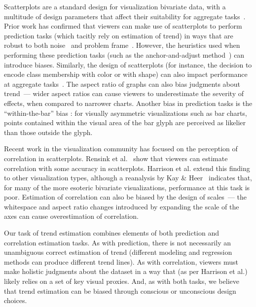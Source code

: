 \documentclass{sigchi}
\begin{document}
Scatterplots are a standard design for visualization bivariate data, with a multitude of design parameters that affect their suitability for aggregate tasks~\cite{cleveland1984many}. Prior work has confirmed that viewers can make use of scatterplots to perform prediction tasks (which tacitly rely on estimation of trend) in ways that are robust to both noise~\cite{harvey1997effects} and problem frame~\cite{lewandowsky2011popular}. However, the heuristics used when performing these prediction tasks (such as the anchor-and-adjust method~\cite{bolger1993context}) can introduce biases. Similarly, the design of scatterplots (for instance, the decision to encode class membership with color or with shape) can also impact performance at aggregate tasks~\cite{gleicher2013perception,lewandowsky1989discriminating}. The aspect ratio of graphs can also bias judgments about trend~\cite{beattie2002impact}--- wider aspect ratios can cause viewers to underestimate the severity of effects, when compared to narrower charts. Another bias in prediction tasks is the ``within-the-bar'' bias \cite{newman2012bar}: for visually asymmetric visualizations such as bar charts, points contained within the visual area of the bar glyph are perceived as likelier than those outside the glyph. 

Recent work in the visualization community has focused on the perception of correlation in scatterplots. Rensink et al.~\cite{rensink2010perception} show that viewers can estimate correlation with some accuracy in scatterplots. Harrison et al. \cite{harrison2014ranking} extend this finding to other visualization types, although a reanalysis by Kay \& Heer~\cite{kay2016beyond} indicates that, for many of the more esoteric bivariate visualizations, performance at this task is poor. Estimation of correlation can also be biased by the design of scales~\cite{cleveland1982variables}--- the whitespace and aspect ratio changes introduced by expanding the scale of the axes can cause overestimation of correlation.

Our task of trend estimation combines elements of both prediction and correlation estimation tasks. As with prediction, there is not necessarily an unambiguous correct estimation of trend (different modeling and regression methods can produce different trend lines). As with correlation, viewers must make holistic judgments about the dataset in a way that (as per Harrison et al.) likely relies on a set of key visual proxies. And, as with both tasks, we believe that trend estimation can be biased through conscious or unconscious design choices.  
\end{document}
